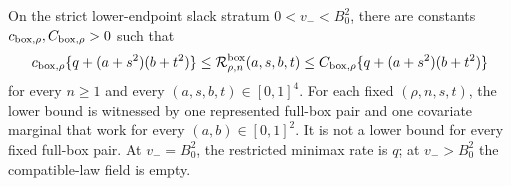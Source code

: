 \begin{theorem}
\label{thm:full-box-minimax}
On the strict lower-endpoint slack stratum $0<v_-<B_0^2$, there are
constants $c_{{\rm box},\rho},C_{{\rm box},\rho}>0$ such that
\begin{equation}
 c_{{\rm box},\rho}\{q+(a+s^2)(b+t^2)\}
 \le \mathcal R^{\rm box}_{\rho,n}(a,s,b,t)
 \le C_{{\rm box},\rho}\{q+(a+s^2)(b+t^2)\}
 \label{eq:adaptation-box-minimax-rate}
\end{equation}
for every $n\ge1$ and every $(a,s,b,t)\in[0,1]^4$. For each fixed
$(\rho,n,s,t)$, the lower bound is witnessed by one represented full-box
pair and one covariate marginal that work for every $(a,b)\in[0,1]^2$.
It is not a lower bound for every fixed full-box pair. At
$v_-=B_0^2$, the restricted minimax rate is $q$; at $v_->B_0^2$ the
compatible-law field is empty.
\end{theorem}

